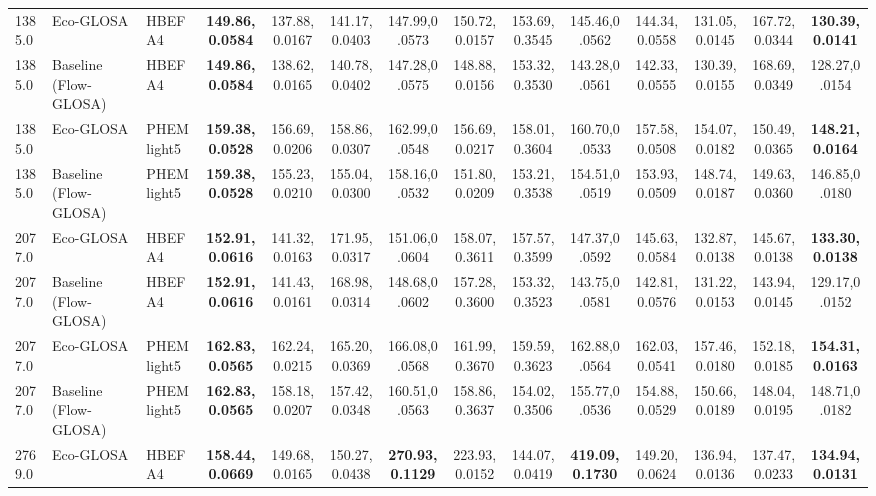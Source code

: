 \begin{table}[htb]
{\begin{tabular}{l l l *{11}{c}}
      1385.0 & Eco-GLOSA               & HBEFA4       & \textbf{149.86,0.0584}   & 137.88,0.0167 & 141.17,0.0403 & 147.99,0.0573 & 150.72,0.0157 & 153.69,0.3545 & 145.46,0.0562 & 144.34,0.0558 & 131.05,0.0145 & 167.72,0.0344 & \textbf{130.39,0.0141} \\
      1385.0 & Baseline (Flow-GLOSA)   & HBEFA4       & \textbf{149.86,0.0584}   & 138.62,0.0165 & 140.78,0.0402 & 147.28,0.0575 & 148.88,0.0156 & 153.32,0.3530 & 143.28,0.0561 & 142.33,0.0555 & 130.39,0.0155 & 168.69,0.0349 & 128.27,0.0154 \\
      1385.0 & Eco-GLOSA               & PHEMlight5   & \textbf{159.38,0.0528}   & 156.69,0.0206 & 158.86,0.0307 & 162.99,0.0548 & 156.69,0.0217 & 158.01,0.3604 & 160.70,0.0533 & 157.58,0.0508 & 154.07,0.0182 & 150.49,0.0365 & \textbf{148.21,0.0164} \\
      1385.0 & Baseline (Flow-GLOSA)   & PHEMlight5   & \textbf{159.38,0.0528}   & 155.23,0.0210 & 155.04,0.0300 & 158.16,0.0532 & 151.80,0.0209 & 153.21,0.3538 & 154.51,0.0519 & 153.93,0.0509 & 148.74,0.0187 & 149.63,0.0360 & 146.85,0.0180 \\
      \midrule
      2077.0 & Eco-GLOSA               & HBEFA4       & \textbf{152.91,0.0616}   & 141.32,0.0163 & 171.95,0.0317 & 151.06,0.0604 & 158.07,0.3611 & 157.57,0.3599 & 147.37,0.0592 & 145.63,0.0584 & 132.87,0.0138 & 145.67,0.0138 & \textbf{133.30,0.0138} \\
      2077.0 & Baseline (Flow-GLOSA)   & HBEFA4       & \textbf{152.91,0.0616}   & 141.43,0.0161 & 168.98,0.0314 & 148.68,0.0602 & 157.28,0.3600 & 153.32,0.3523 & 143.75,0.0581 & 142.81,0.0576 & 131.22,0.0153 & 143.94,0.0145 & 129.17,0.0152 \\
      2077.0 & Eco-GLOSA               & PHEMlight5   & \textbf{162.83,0.0565}   & 162.24,0.0215 & 165.20,0.0369 & 166.08,0.0568 & 161.99,0.3670 & 159.59,0.3623 & 162.88,0.0564 & 162.03,0.0541 & 157.46,0.0180 & 152.18,0.0185 & \textbf{154.31,0.0163} \\
      2077.0 & Baseline (Flow-GLOSA)   & PHEMlight5   & \textbf{162.83,0.0565}   & 158.18,0.0207 & 157.42,0.0348 & 160.51,0.0563 & 158.86,0.3637 & 154.02,0.3506 & 155.77,0.0536 & 154.88,0.0529 & 150.66,0.0189 & 148.04,0.0195 & 148.71,0.0182 \\
      \midrule
      2769.0 & Eco-GLOSA               & HBEFA4       & \textbf{158.44,0.0669}   & 149.68,0.0165 & 150.27,0.0438 & \textbf{270.93,0.1129} & 223.93,0.0152 & 144.07,0.0419 & \textbf{419.09,0.1730} & 149.20,0.0624 & 136.94,0.0136 & 137.47,0.0233 & \textbf{134.94,0.0131} \\

\end{tabular}}
\end{table}

